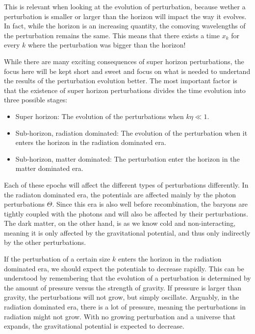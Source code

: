 \documentclass[12pt]{article}
\begin{document}
This is relevant when looking at the evolution of perturbation, because wether a perturbation is smaller or larger than the horizon will impact the way it evolves. In fact, while the horizon is an increasing quantity, the comoving wavelengths of the perturbation remains the same. This means that there exists a time $x_k$ for every $k$ where the perturbation was bigger than the horizon!

While there are many exciting consequences of super horizon perturbations, the focus here will be kept short and sweet and focus on what is needed to undertand the results of the perturbation evolution better. The most important factor is that the existence of super horizon perturbations divides the time evolution into three possible stages:

\begin{itemize}
    \item Super horizon: The evolution of the perturbations when $k\eta \ll 1$.
    \item Sub-horizon, radiation dominated: The evolution of the perturbation when it enters the horizon in the radiation dominated era.
    \item Sub-horizon, matter dominated: The perturbation enter the horizon in the matter dominated era.
\end{itemize}

Each of these epochs will affect the different types of perturbations differently. In the radiaton dominated era, the potentials are affected mainly by the photon perturbations $\Theta$. Since this era is also well before recombination, the baryons are tightly coupled with the photons and will also be affected by their perturbations. The dark matter, on the other hand, is as we know cold and non-interacting, meaning it is only affected by the gravitational potential, and thus only indirectly by the other perturbations. 

If the perturbation of a certain size $k$ enters the horizon in the radiation dominated era, we should expect the potentials to decrease rapidly. This can be understood by remembering that the evolution of a perturbation is determined by the amount of pressure versus the strength of gravity. If pressure is larger than gravity, the perturbations will not grow, but simply oscillate. Arguably, in the radiation dominated era, there is a lot of pressure, meaning the perturbations in radiation might not grow. With no growing perturbation and a universe that expands, the gravitational potential is expected to decrease. 
\end{document}
